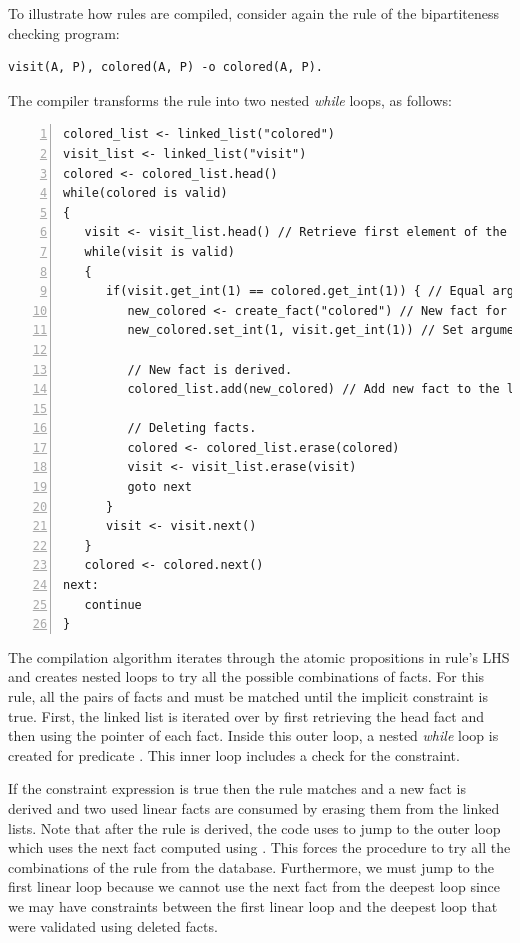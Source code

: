 To illustrate how rules are compiled, consider again the rule of the
bipartiteness checking program:

\begin{Verbatim}[fontsize=\codesize]
visit(A, P), colored(A, P) -o colored(A, P).
\end{Verbatim}

The compiler transforms the rule into two nested \emph{while} loops, as follows:

\begin{Verbatim}[numbers=left,fontsize=\codesize]
colored_list <- linked_list("colored")
visit_list <- linked_list("visit")
colored <- colored_list.head()
while(colored is valid)
{
   visit <- visit_list.head() // Retrieve first element of the list.
   while(visit is valid)
   {
      if(visit.get_int(1) == colored.get_int(1)) { // Equal arguments?
         new_colored <- create_fact("colored") // New fact for predicate colored.
         new_colored.set_int(1, visit.get_int(1)) // Set arguments.

         // New fact is derived.
         colored_list.add(new_colored) // Add new fact to the linked list.

         // Deleting facts.
         colored <- colored_list.erase(colored)
         visit <- visit_list.erase(visit)
         goto next
      }
      visit <- visit.next()
   }
   colored <- colored.next()
next:
   continue
}
\end{Verbatim}

The compilation algorithm iterates through the atomic propositions in rule's LHS
and creates nested loops to try all the possible combinations of facts.  For
this rule, all the pairs of facts  and  must be
matched until the implicit constraint is true. First, the  linked
list is iterated over by first retrieving the head fact and then using the
 pointer of each fact. Inside this outer loop, a nested \emph{while}
loop is created for predicate . This inner loop includes a check for
the constraint.

If the constraint expression is true then the rule matches and a new
 fact is derived and two used linear facts are consumed by erasing
them from the linked lists. Note that after the rule is derived, the code uses
 to jump to the outer loop which uses the next 
fact computed using . This forces the
procedure to try all the combinations of the rule from the database.
Furthermore, we must jump to the first linear loop because we cannot use the
next fact from the deepest loop since we may have constraints between the first
linear loop and the deepest loop that were validated using deleted facts.

